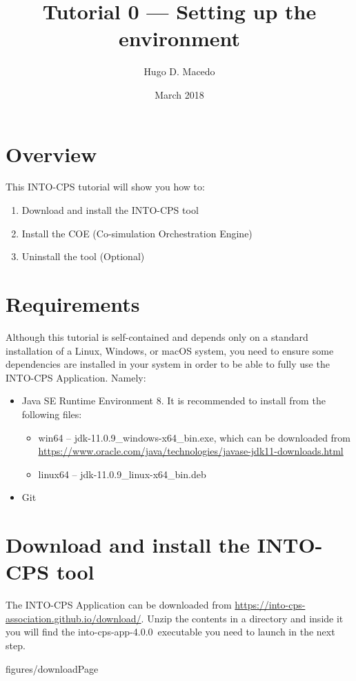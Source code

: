 \documentclass[11pt,a4paper]{../tutorial}
\title{Tutorial 0 --- Setting up the environment}
\date{March 2018}
\author{Hugo D. Macedo}
\def\intocpsVer{4.0.0}
\newcommand{\JavaURL}{https://www.oracle.com/java/technologies/javase-jdk11-downloads.html}
\newcommand{\JavaWinVer}{jdk-11.0.9\_windows-x64\_bin.exe}
\begin{document}
\section*{Overview}

This INTO-CPS tutorial will show you how to:

\begin{enumerate}[noitemsep]
\item Download and install the INTO-CPS tool
\item Install the COE (Co-simulation Orchestration Engine)
\item Uninstall the tool (Optional) 
\end{enumerate}

\section*{Requirements}

Although this tutorial is self-contained and depends only on a standard
installation of a Linux, Windows, or macOS system, you need to ensure some
dependencies are installed in your system in order to be able to fully use the
INTO-CPS Application. Namely: 

\begin{itemize}[noitemsep]
	\item Java SE Runtime Environment 8. It is recommended to install from the following files: 
	\begin{itemize}
	\item win64 -- \JavaWinVer, which can be downloaded from \url{\JavaURL} 
	\item linux64 -- jdk-11.0.9\_linux-x64\_bin.deb
	\end{itemize}
\item Git
\end{itemize}


\section{Download and install the INTO-CPS tool}


\begin{instructions} 

\item The INTO-CPS Application can be downloaded from
	\url{https://into-cps-association.github.io/download/}. Unzip the
	contents in a directory and inside it you will find the into-cps-app-\intocpsVer\
	executable you need to launch in the next step. 
	
	\begin{annotation}[width=0.85\linewidth]{figures/downloadPage}
	\end{annotation}

\end{instructions}
\end{document}
